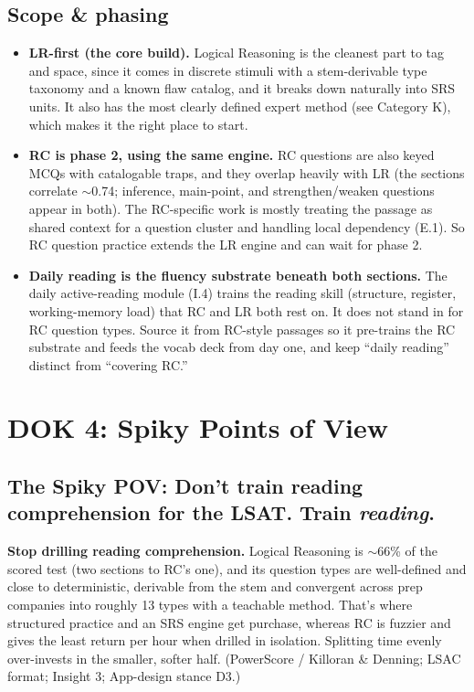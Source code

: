 \documentclass[11pt]{article}
\begin{document}
\subsection*{Scope \& phasing}
\begin{itemize}
\item \textbf{LR-first (the core build).} Logical Reasoning is the cleanest part to tag and space, since it comes in discrete stimuli with a stem-derivable type taxonomy and a known flaw catalog, and it breaks down naturally into SRS units. It also has the most clearly defined expert method (see Category K), which makes it the right place to start.
\item \textbf{RC is phase 2, using the same engine.} RC questions are also keyed MCQs with catalogable traps, and they overlap heavily with LR (the sections correlate $\sim$0.74; inference, main-point, and strengthen/weaken questions appear in both). The RC-specific work is mostly treating the passage as shared context for a question cluster and handling local dependency (E.1). So RC question practice extends the LR engine and can wait for phase 2.
\item \textbf{Daily reading is the fluency substrate beneath both sections.} The daily active-reading module (I.4) trains the reading skill (structure, register, working-memory load) that RC and LR both rest on. It does not stand in for RC question types. Source it from RC-style passages so it pre-trains the RC substrate and feeds the vocab deck from day one, and keep \enquote{daily reading} distinct from \enquote{covering RC.}
\end{itemize}

\section*{DOK 4: Spiky Points of View}

\subsection*{The Spiky POV: Don't train reading comprehension for the LSAT. Train \textit{reading}.}

\textbf{Stop drilling reading comprehension.} Logical Reasoning is $\sim$66\% of the scored test (two sections to RC's one), and its question types are well-defined and close to deterministic, derivable from the stem and convergent across prep companies into roughly 13 types with a teachable method. That's where structured practice and an SRS engine get purchase, whereas RC is fuzzier and gives the least return per hour when drilled in isolation. Splitting time evenly over-invests in the smaller, softer half. (PowerScore / Killoran \& Denning; LSAC format; Insight 3; App-design stance D3.)
\end{document}
